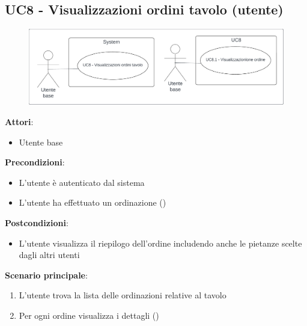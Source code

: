 \subsection{UC8 - Visualizzazioni ordini tavolo (utente)}\label{usecase:8}
\begin{figure}[H]
    \centering
    \includegraphics[width=0.9\linewidth]{ucd/ucd8.png}
\end{figure}
\textbf{Attori}:
\begin{itemize}
    \item Utente base
\end{itemize}
\textbf{Precondizioni}:
\begin{itemize}
    \item L'utente è autenticato dal sistema
    \item L'utente ha effettuato un ordinazione ()
\end{itemize}
\textbf{Postcondizioni}:
\begin{itemize}
    \item L'utente visualizza il riepilogo dell'ordine includendo anche le pietanze scelte dagli altri utenti
\end{itemize}
\textbf{Scenario principale}:
\begin{enumerate}
    \item L'utente trova la lista delle ordinazioni relative al tavolo
    \item Per ogni ordine visualizza i dettagli ()
\end{enumerate}
